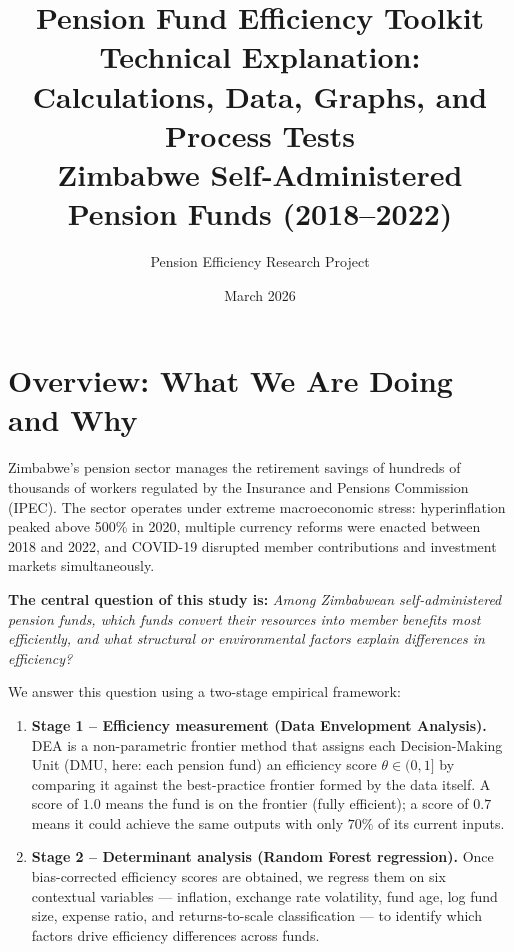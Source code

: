 \documentclass[12pt,a4paper]{article}
\title{%
    \textbf{Pension Fund Efficiency Toolkit}\\[0.4em]
    \large Technical Explanation: Calculations, Data, Graphs, and Process Tests\\[0.2em]
    \normalsize Zimbabwe Self-Administered Pension Funds (2018--2022)
}
\author{Pension Efficiency Research Project}
\date{March 2026}
\begin{document}
\maketitle
\tableofcontents
\newpage

\section{Overview: What We Are Doing and Why}

Zimbabwe's pension sector manages the retirement savings of hundreds of thousands of
workers regulated by the Insurance and Pensions Commission (IPEC).  The sector
operates under extreme macroeconomic stress: hyperinflation peaked above 500\% in
2020, multiple currency reforms were enacted between 2018 and 2022, and COVID-19
disrupted member contributions and investment markets simultaneously.

\textbf{The central question of this study is:} \emph{Among Zimbabwean
self-administered pension funds, which funds convert their resources into member
benefits most efficiently, and what structural or environmental factors explain
differences in efficiency?}

We answer this question using a two-stage empirical framework:

\begin{enumerate}[leftmargin=2cm]
    \item \textbf{Stage 1 -- Efficiency measurement (Data Envelopment Analysis).}
          DEA is a non-parametric frontier method that assigns each Decision-Making Unit
          (DMU, here: each pension fund) an efficiency score $\theta \in (0, 1]$ by
          comparing it against the best-practice frontier formed by the data itself.
          A score of $1.0$ means the fund is on the frontier (fully efficient);
          a score of $0.7$ means it could achieve the same outputs with only $70\%$ of
          its current inputs.

    \item \textbf{Stage 2 -- Determinant analysis (Random Forest regression).}
          Once bias-corrected efficiency scores are obtained, we regress them on six
          contextual variables --- inflation, exchange rate volatility, fund age,
          log fund size, expense ratio, and returns-to-scale classification --- to
          identify which factors drive efficiency differences across funds.
\end{enumerate}
\end{document}
